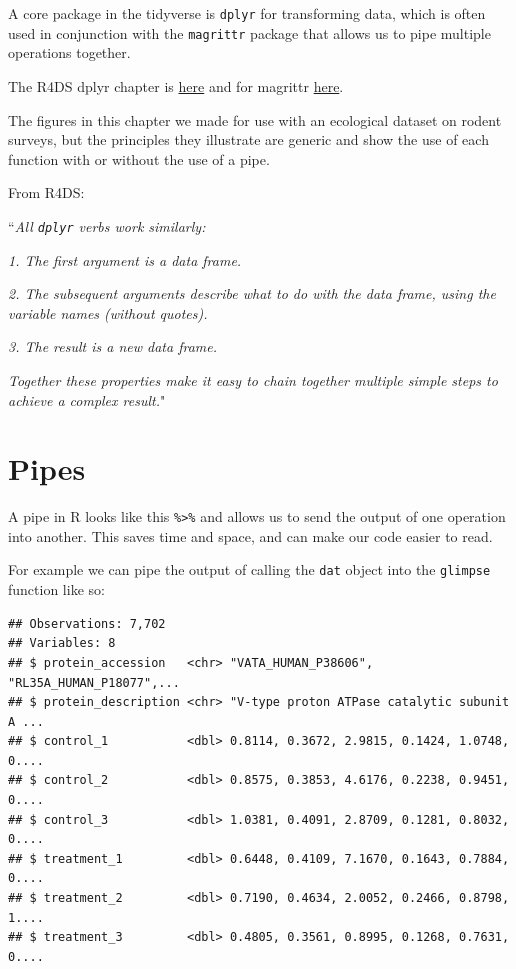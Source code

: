 \documentclass[12pt,]{book}
\newenvironment{Shaded}{\begin{snugshade}}{\end{snugshade}}
\newcommand{\KeywordTok}[1]{\textcolor[rgb]{0.13,0.29,0.53}{\textbf{#1}}}
\newcommand{\StringTok}[1]{\textcolor[rgb]{0.31,0.60,0.02}{#1}}
\newcommand{\OperatorTok}[1]{\textcolor[rgb]{0.81,0.36,0.00}{\textbf{#1}}}
\newcommand{\NormalTok}[1]{#1}
\theoremstyle{definition}
\theoremstyle{definition}
\theoremstyle{definition}
\theoremstyle{remark}
\begin{document}
A core package in the tidyverse is \texttt{dplyr} for transforming data,
which is often used in conjunction with the \texttt{magrittr} package
that allows us to pipe multiple operations together.

The R4DS dplyr chapter is
\href{http://r4ds.had.co.nz/transform.html}{here} and for magrittr
\href{http://r4ds.had.co.nz/pipes.html}{here}.

The figures in this chapter we made for use with an ecological dataset
on rodent surveys, but the principles they illustrate are generic and
show the use of each function with or without the use of a pipe.

From R4DS:

``\emph{All \texttt{dplyr} verbs work similarly:}

\emph{1. The first argument is a data frame.}

\emph{2. The subsequent arguments describe what to do with the data
frame, using the variable names (without quotes).}

\emph{3. The result is a new data frame.}

\emph{Together these properties make it easy to chain together multiple
simple steps to achieve a complex result.}"

\section{Pipes}\label{pipes}

A pipe in R looks like this \texttt{\%\textgreater{}\%} and allows us to
send the output of one operation into another. This saves time and
space, and can make our code easier to read.

For example we can pipe the output of calling the \texttt{dat} object
into the \texttt{glimpse} function like so:

\begin{Shaded}
\end{Shaded}

\begin{verbatim}
## Observations: 7,702
## Variables: 8
## $ protein_accession   <chr> "VATA_HUMAN_P38606", "RL35A_HUMAN_P18077",...
## $ protein_description <chr> "V-type proton ATPase catalytic subunit A ...
## $ control_1           <dbl> 0.8114, 0.3672, 2.9815, 0.1424, 1.0748, 0....
## $ control_2           <dbl> 0.8575, 0.3853, 4.6176, 0.2238, 0.9451, 0....
## $ control_3           <dbl> 1.0381, 0.4091, 2.8709, 0.1281, 0.8032, 0....
## $ treatment_1         <dbl> 0.6448, 0.4109, 7.1670, 0.1643, 0.7884, 0....
## $ treatment_2         <dbl> 0.7190, 0.4634, 2.0052, 0.2466, 0.8798, 1....
## $ treatment_3         <dbl> 0.4805, 0.3561, 0.8995, 0.1268, 0.7631, 0....
\end{verbatim}
\end{document}
